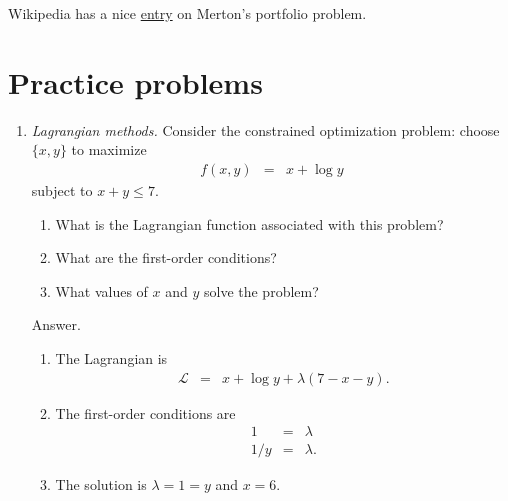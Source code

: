 \documentclass[11pt]{article}
\begin{document}
Wikipedia has a nice
\href{http://en.wikipedia.org/wiki/Merton's_portfolio_problem}{entry}
on Merton's portfolio problem.


\section*{Practice problems}

\begin{enumerate}
\item {\it Lagrangian methods.\/}
Consider the constrained optimization problem:  choose $\{x,y\}$
to maximize
\begin{eqnarray*}
    f(x,y) &=& x + \log y
\end{eqnarray*}
subject to $ x + y \leq 7$.
%
\begin{enumerate}
\item What is the Lagrangian function associated with this problem?
\item What are the first-order conditions?
\item What values of $x$ and $y$ solve the problem?
\end{enumerate}
%
Answer.
\begin{enumerate}
\item The Lagrangian is
\begin{eqnarray*}
    \mathcal{L} &=& x + \log y  + \lambda (7 - x - y ).
\end{eqnarray*}
\item The first-order conditions are
\begin{eqnarray*}
    1 &=& \lambda \\
    1/y &=& \lambda .
\end{eqnarray*}
\item The solution is $\lambda = 1 = y$ and $x = 6$.
\end{enumerate}


\end{enumerate}
\end{document}
